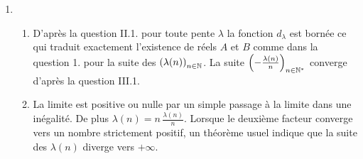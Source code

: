 \begin{enumerate}
 \item
\begin{enumerate}
 \item D'après la question II.1. pour toute pente $\lambda$ la fonction $d_\lambda$ est bornée ce qui traduit exactement l'existence de réels $A$ et $B$ comme dans la question 1. pour la suite des $\left( \lambda(n)\right) _{n\in \mathbb{N}}$. La suite $\left( -\frac{\lambda(n)}{n}\right) _{n\in \mathbb{N}^*}$ converge d'après la question III.1.
 \item La limite est positive ou nulle par un simple passage à la limite dans une inégalité. De plus $\lambda(n) = n \,\frac{\lambda(n)}{n}$. Lorsque le deuxième facteur converge vers un nombre strictement positif, un théorème usuel indique que la suite des $\lambda(n)$ diverge vers $+\infty$.
\end{enumerate}


\end{enumerate}

